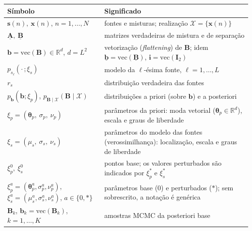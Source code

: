 \documentclass[11pt]{article}
\newcounter{none}
\begin{document}
{\def\LTcaptype{none} %
\begin{longtable}[]{@{}
  >{\raggedright\arraybackslash}p{}
  >{\raggedright\arraybackslash}p{}@{}}
\toprule\noalign{}
\begin{minipage}[b]{\linewidth}\raggedright
Símbolo
\end{minipage} & \begin{minipage}[b]{\linewidth}\raggedright
Significado
\end{minipage} \\
\midrule\noalign{}
\endhead
\bottomrule\noalign{}
\endlastfoot
\(\mathbf{s}(n),\ \mathbf{x}(n)\), \(n=1,\dots,N\) & fontes e misturas;
realização \(\mathcal X = \{\mathbf{x}(n)\}\) \\
\(\underline{\mathbf{A}},\ \underline{\mathbf{B}}\) & matrizes
verdadeiras de mistura e de separação \\
\(\mathbf b = \mathrm{vec}(\mathbf B) \in \mathbb R^{d}\), \(d = L^2\) &
vetorização (\emph{flattening}) de \(\mathbf B\); idem
\(\underline{\mathbf b} = \mathrm{vec}(\underline{\mathbf B})\),
\(\mathbf i = \mathrm{vec}(\mathbf I_2)\) \\
\(p_{s_\ell}(\cdot\,;\xi_s)\) & modelo da \(\ell\)-ésima fonte,
\(\ell = 1,\dots,L\) \\
\(r_s\) & distribuição verdadeira das fontes \\
\(p_{\mathbf b}(\mathbf b;\xi_p)\),
\(p_{\mathbf B\mid\mathcal X}(\mathbf B\mid\mathcal X)\) & distribuições
a priori (sobre \(\mathbf b\)) e a posteriori \\
\(\xi_p = (\boldsymbol\theta_p,\ \sigma_p,\ \nu_p)\) & parâmetros da
priori: moda vetorial (\(\boldsymbol\theta_p\in\mathbb R^d\)), escala e
graus de liberdade \\
\(\xi_s = (\mu_s,\ \sigma_s,\ \nu_s)\) & parâmetros do modelo das fontes
(verossimilhança): localização, escala e graus de liberdade \\
\(\xi_p^{0},\ \xi_s^{0}\) & pontos base; os valores perturbados são
indicados por \(\xi_p^{*}\) e \(\xi_s^{*}\) \\
\(\xi_p^{a}=(\boldsymbol\theta_p^{a},\sigma_p^{a},\nu_p^{a})\),
\(\xi_s^{a}=(\mu_s^{a},\sigma_s^{a},\nu_s^{a})\), \(a\in\{0,*\}\) &
parâmetros base (\(0\)) e perturbados (\(*\)); sem sobrescrito, a
notação é genérica \\
\(\mathbf B_k\), \(\mathbf b_k = \mathrm{vec}(\mathbf B_k)\),
\(k = 1,\dots,K\) & amostras MCMC da posteriori base \\
\end{longtable}
}
\end{document}

